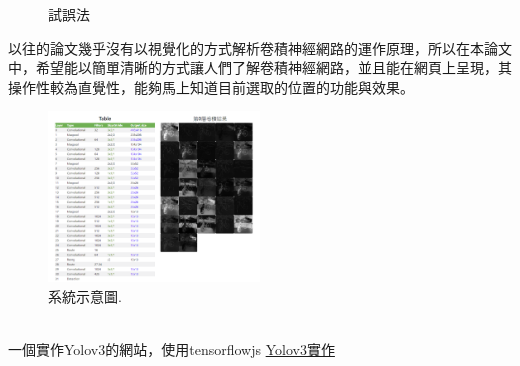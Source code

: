 \begin{figure}[H]
\centering  
{}
\caption{試誤法}
\label{Fig.main}
\end{figure}
以往的論文幾乎沒有以視覺化的方式解析卷積神經網路的運作原理，所以在本論文中，希望能以簡單清晰的方式讓人們了解卷積神經網路，並且能在網頁上呈現，其操作性較為直覺性，能夠馬上知道目前選取的位置的功能與效果。
\begin{figure}[htpb!]
  \centering
    \includegraphics[width=0.5\textwidth]{fig/system1.png}
    \caption{\label{fig:系統1}系統示意圖.}
\end{figure}
\\一個實作Yolov3的網站，使用tensorflowjs
\href{https://zqingr.github.io/tfjs-yolov3-demo}{Yolov3實作}
